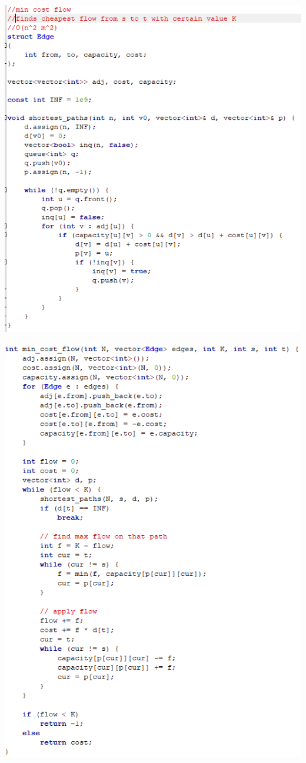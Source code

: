 \documentclass[11pt,twocolumn]{article}
\begin{document}
\includegraphics[scale=0.6]{mincostflowa}

\includegraphics[scale=0.6]{mincostflowb}
\end{document}
